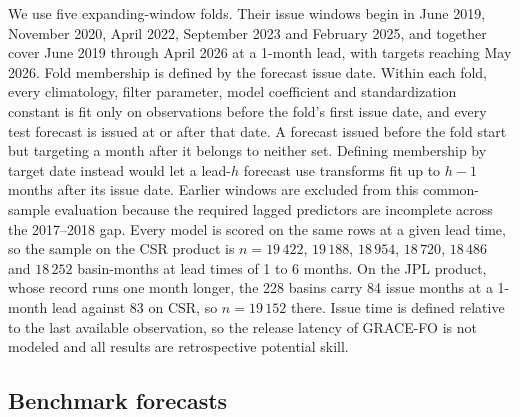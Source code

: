 \documentclass[hess, manuscript]{copernicus}
\begin{document}
We use five expanding-window folds. Their issue windows begin in June
2019, November 2020, April 2022, September 2023 and February 2025, and
together cover June 2019 through April 2026 at a 1-month lead, with
targets reaching May 2026.
Fold membership is defined by the forecast issue date. Within each fold,
every climatology, filter parameter, model coefficient and standardization
constant is fit only on observations before the fold's first issue date,
and every test forecast is issued at or after that date. A forecast issued
before the fold start but targeting a month after it belongs to neither
set. Defining membership by target date instead would let a lead-$h$
forecast use transforms fit up to $h-1$ months after its issue date.
Earlier windows are excluded from this common-sample evaluation because
the required lagged predictors are incomplete across the 2017--2018 gap.
Every model is scored on the same rows at
a given lead time, so the sample on the CSR product is
$n = 19\,422$, $19\,188$, $18\,954$, $18\,720$, $18\,486$ and $18\,252$
basin-months at lead times of 1 to 6 months. On the JPL product, whose
record runs one month longer, the 228 basins carry 84 issue months at a
1-month lead against 83 on CSR, so
$n = 19\,152$ there. Issue time is defined relative to the last available
observation, so the release latency of GRACE-FO is not modeled and all
results are retrospective potential skill.

\subsection{Benchmark forecasts}
\label{sec:methods-benchmarks}
\end{document}
